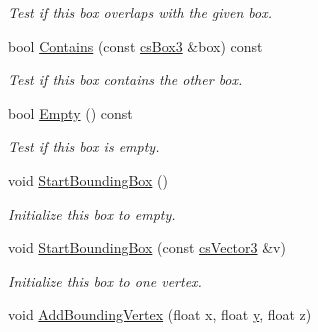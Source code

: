\begin{DoxyCompactItemize}
\begin{DoxyCompactList}\small\item\em Test if this box overlaps with the given box. \end{DoxyCompactList}\item 
bool \hyperlink{classcsBox3_a07627740a824d7ab267b47d84cc941c3}{Contains} (const \hyperlink{classcsBox3}{cs\+Box3} \&box) const \hypertarget{classcsBox3_a07627740a824d7ab267b47d84cc941c3}{}\label{classcsBox3_a07627740a824d7ab267b47d84cc941c3}

\begin{DoxyCompactList}\small\item\em Test if this box contains the other box. \end{DoxyCompactList}\item 
bool \hyperlink{classcsBox3_a5f5ea5715fcd1c3f6e872bd738003c46}{Empty} () const \hypertarget{classcsBox3_a5f5ea5715fcd1c3f6e872bd738003c46}{}\label{classcsBox3_a5f5ea5715fcd1c3f6e872bd738003c46}

\begin{DoxyCompactList}\small\item\em Test if this box is empty. \end{DoxyCompactList}\item 
void \hyperlink{classcsBox3_a80242120b00afc06f7279bef87f08845}{Start\+Bounding\+Box} ()\hypertarget{classcsBox3_a80242120b00afc06f7279bef87f08845}{}\label{classcsBox3_a80242120b00afc06f7279bef87f08845}

\begin{DoxyCompactList}\small\item\em Initialize this box to empty. \end{DoxyCompactList}\item 
void \hyperlink{classcsBox3_ad75ddae9c8600e2d34ac29cfaa37c1a0}{Start\+Bounding\+Box} (const \hyperlink{classcsVector3}{cs\+Vector3} \&v)\hypertarget{classcsBox3_ad75ddae9c8600e2d34ac29cfaa37c1a0}{}\label{classcsBox3_ad75ddae9c8600e2d34ac29cfaa37c1a0}

\begin{DoxyCompactList}\small\item\em Initialize this box to one vertex. \end{DoxyCompactList}\item 
void \hyperlink{classcsBox3_a8b6848ac4bfe8795d6f412cea3700368}{Add\+Bounding\+Vertex} (float x, float \hyperlink{IceUtils_8h_aa7ffaed69623192258fb8679569ff9ba}{y}, float z)\hypertarget{classcsBox3_a8b6848ac4bfe8795d6f412cea3700368}{}\label{classcsBox3_a8b6848ac4bfe8795d6f412cea3700368}


\end{DoxyCompactItemize}
